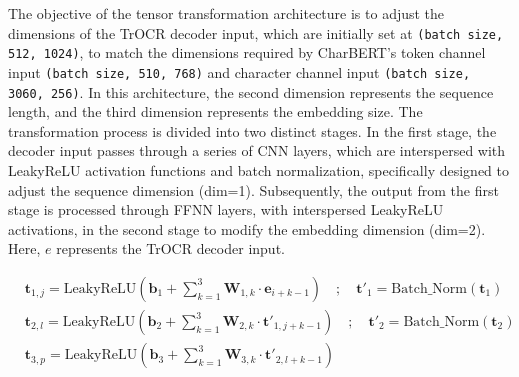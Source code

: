 
The objective of the tensor transformation architecture is to adjust the dimensions of the TrOCR decoder input, which are initially set at \texttt{(batch size, 512, 1024)}, to match the dimensions required by CharBERT's token channel input \texttt{(batch size, 510, 768)} and character channel input \texttt{(batch size, 3060, 256)}. In this architecture, the second dimension represents the sequence length, and the third dimension represents the embedding size. The transformation process is divided into two distinct stages. In the first stage, the decoder input passes through a series of CNN layers, which are interspersed with LeakyReLU activation functions and batch normalization, specifically designed to adjust the sequence dimension (dim=1). Subsequently, the output from the first stage is processed through FFNN layers, with interspersed LeakyReLU activations, in the second stage to modify the embedding dimension (dim=2). Here, $e$ represents the TrOCR decoder input.

\begin{equation} \label{eq:3_tensor_transform_cnn}
    \begin{split}
        &\mathbf{t}_{1, j} = \text{LeakyReLU}(\mathbf{b}_1 + \sum_{k=1}^{3}\mathbf{W}_{1,k}\cdot \mathbf{e}_{i+k-1})\quad;\quad \mathbf{t}'_1 = \text{Batch\_Norm}(\mathbf{t}_1)\\
        &\mathbf{t}_{2, l} = \text{LeakyReLU}(\mathbf{b}_2 + \sum_{k=1}^{3}\mathbf{W}_{2,k}\cdot \mathbf{t}'_{1,j+k-1})\quad;\quad \mathbf{t}'_2 = \text{Batch\_Norm}(\mathbf{t}_2)\\
        &\mathbf{t}_{3, p} = \text{LeakyReLU}(\mathbf{b}_3 + \sum_{k=1}^{3}\mathbf{W}_{3,k}\cdot \mathbf{t}'_{2,l+k-1})\quad\\
    \end{split}
\end{equation}

